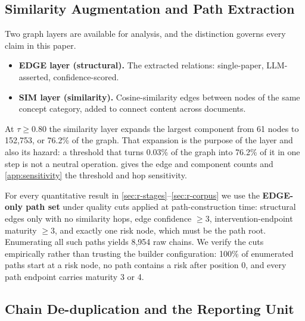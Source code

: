 \documentclass[10pt,twocolumn,letterpaper]{article}
\begin{document}
\subsection{Similarity Augmentation and Path Extraction}
\label{sec:m-paths}

Two graph layers are available for analysis, and the distinction governs every claim in
this paper.

\begin{itemize}
\setlength{\itemsep}{1pt}
\item \textbf{EDGE layer (structural).} The extracted relations: single-paper,
LLM-asserted, confidence-scored.
\item \textbf{SIM layer (similarity).} Cosine-similarity edges between nodes of the same
concept category, added to connect content across documents.
\end{itemize}

At $\tau \geq 0.80$ the similarity layer expands the largest component from 61 nodes to
152{,}753, or 76.2\% of the graph. That expansion is the purpose of the layer and also
its hazard: a threshold that turns 0.03\% of the graph into 76.2\% of it in one step is
not a neutral operation.  gives the edge and component counts and
\cref{app:sensitivity} the threshold and hop sensitivity.

For every quantitative result in \cref{sec:r-stages}--\cref{sec:r-corpus} we use the
\textbf{EDGE-only path set} under quality cuts applied at path-construction time:
structural edges only with no similarity hops, edge confidence $\geq 3$,
intervention-endpoint maturity $\geq 3$, and exactly one risk node, which must be the
path root. Enumerating all such paths yields 8{,}954 raw chains. We verify the cuts
empirically rather than trusting the builder configuration: 100\% of enumerated paths
start at a risk node, no path contains a risk after position 0, and every path endpoint
carries maturity 3 or 4.

\subsection{Chain De-duplication and the Reporting Unit}
\label{sec:m-reporting}
\end{document}
